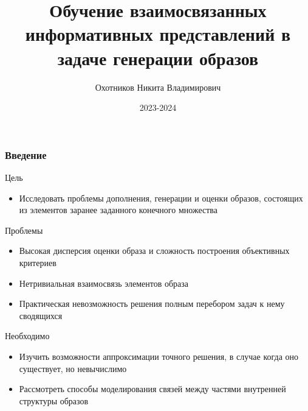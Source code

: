 \documentclass[10pt]{beamer}
\title[]{Обучение взаимосвязанных информативных представлений в задаче генерации образов}
\author{Охотников Никита Владимирович}
\institute{МФТИ}
\date{2023-2024}
\begin{document}
\begin{frame}
  \titlepage
\end{frame}


\begin{frame}
	\frametitle{Введение}
	\begin{block}{Цель}
		\begin{itemize}
			\item Исследовать проблемы дополнения, генерации и оценки образов, состоящих из элементов заранее заданного конечного множества
		\end{itemize}
	\end{block}	
	\vfill
	\begin{block}{Проблемы}
		\begin{itemize}
			\item Высокая дисперсия оценки образа и сложность построения объективных критериев
			\item Нетривиальная взаимосвязь элементов образа 
			\item Практическая невозможность решения полным перебором задач к нему сводящихся
		\end{itemize}
	\end{block}	
	\vfill
	\begin{block}{Необходимо}
		\begin{itemize}
			\item Изучить возможности аппроксимации точного решения, в случае когда оно существует, но невычислимо
			\item Рассмотреть способы моделирования связей между частями внутренней структуры образов
		\end{itemize}
	\end{block}	
\end{frame}
\end{document}
